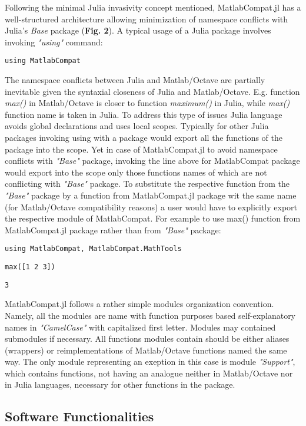 Following the minimal Julia invasivity concept mentioned, MatlabCompat.jl has a well-structured architecture allowing minimization of namespace conflicts with Julia's \textit{Base} package (\textbf{Fig. 2}). A typical usage of a Julia package involves invoking \textit{"using"} command:

\verb|using MatlabCompat|

The namespace conflicts between Julia and Matlab/Octave are partially inevitable given the syntaxial closeness of Julia and Matlab/Octave. E.g. function \textit{max()} in Matlab/Octave is closer to function \textit{maximum()} in Julia, while \textit{max()} function name is taken in Julia. To address this type of issues Julia language avoids global declarations and uses local scopes. Typically for other Julia packages invoking using with a package would export all the functions of the package into the scope. Yet in case of MatlabCompat.jl to avoid namespace conflicts with \textit{"Base"} package, invoking the line above for MatlabCompat package would export into the scope only those functions names of which are not conflicting with \textit{"Base"} package. To substitute the respective function from the \textit{"Base"} package by a function from MatlabCompat.jl package wit the same name (for Matlab/Octave compatibility reasons) a user would have to explicitly export the respective module of MatlabCompat. For example to use max() function from MatlabCompat.jl package rather than from \textit{"Base"} package:

\verb|using MatlabCompat, MatlabCompat.MathTools|

\verb|max([1 2 3])|

\verb|3|


MatlabCompat.jl follows a rather simple modules organization convention. Namely, all the modules are name with function purposes based self-explanatory names in \textit{"CamelCase"} with capitalized first letter. Modules may contained submodules if necessary. All functions modules contain should be either aliases (wrappers) or reimplementations of Matlab/Octave functions named the same way. The only module representing an exeption in this case is module \textit{"Support"}, which contains functions, not having an analogue neither in Matlab/Octave nor in Julia languages, necessary for other functions in the package.

\subsection{Software Functionalities}
\label{Functionalities} 

